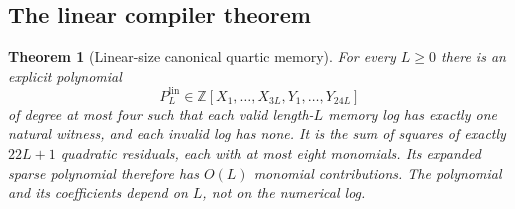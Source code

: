 \documentclass[11pt,a4paper]{article}
\newtheorem{theorem}{Theorem}[section]
\theoremstyle{definition}
\theoremstyle{remark}
\newcommand{\Z}{\mathbb Z}
\begin{document}
\subsection{The linear compiler theorem}
\begin{theorem}[Linear-size canonical quartic memory]\label{cdc:mem:thm:linear-memory}
For every $L\geq0$ there is an explicit polynomial
\[
 P^{\mathrm{lin}}_L\in\Z[X_1,\ldots,X_{3L},Y_1,\ldots,Y_{24L}]
\]
of degree at most four such that each valid length-$L$ memory log has exactly
one natural witness, and each invalid log has none. It is the sum of squares
of exactly $22L+1$ quadratic residuals, each with at most eight monomials.
Its expanded sparse polynomial therefore has $O(L)$ monomial contributions.
The polynomial and its coefficients depend on $L$, not on the numerical log.
\end{theorem}
\end{document}
